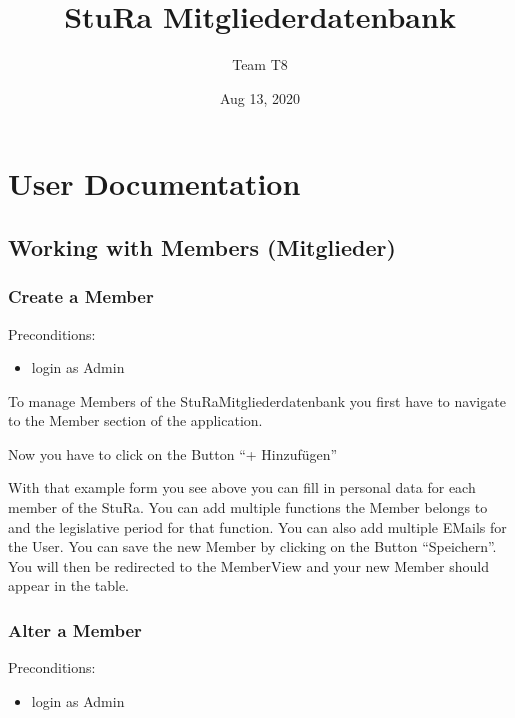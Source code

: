 \documentclass[letterpaper,10pt,english]{sphinxmanual}
\title{StuRa \sphinxhyphen{} Mitgliederdatenbank}
\date{Aug 13, 2020}
\author{Team T8}
\begin{document}
\pagestyle{empty}
\sphinxmaketitle
\pagestyle{plain}
\sphinxtableofcontents
\pagestyle{normal}
\label{\detokenize{index::doc}}



\chapter{User Documentation}
\label{\detokenize{masterUserDoc:user-documentation}}\label{\detokenize{masterUserDoc::doc}}

\section{Working with Members (Mitglieder)}
\label{\detokenize{masterUserDoc:working-with-members-mitglieder}}

\subsection{Create a Member}
\label{\detokenize{masterUserDoc:create-a-member}}
Pre\sphinxhyphen{}conditions:
\begin{itemize}
\item {} 
login as Admin

\end{itemize}

To manage Members of the StuRa\sphinxhyphen{}Mitgliederdatenbank you first have to navigate
to the Member section of the application.

\noindent{}

Now you have to click on the Button “+ Hinzufügen”

\noindent{}

\noindent{}

With that example form you see above you can fill in personal data for
each member of the StuRa. You can add multiple functions the Member belongs to
and the legislative period for that function. You can also add multiple
E\sphinxhyphen{}Mails for the User. You can save the new Member by clicking on the Button
“Speichern”. You will then be redirected to the Member\sphinxhyphen{}View and your
new Member should appear in the table.


\subsection{Alter a Member}
\label{\detokenize{masterUserDoc:alter-a-member}}
Pre\sphinxhyphen{}conditions:
\begin{itemize}
\item {} 
login as Admin

\end{itemize}
\end{document}

